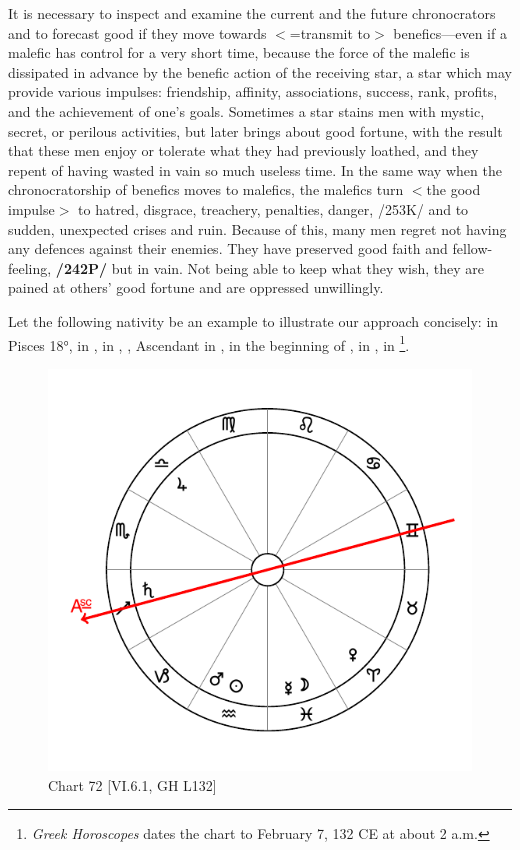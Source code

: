 It is necessary to inspect and examine the current and the future chronocrators and to forecast good if they move towards $<$=transmit to$>$ benefics—even if a malefic has control for a very short time, because the force of the malefic is dissipated in advance by the benefic action of the receiving star, a star which may provide various impulses: friendship, affinity, associations, success, rank, profits, and the achievement of one’s goals. Sometimes a star stains men with mystic, secret, or perilous activities, but later brings about good fortune, with the result that these men enjoy or tolerate what they had previously loathed, and they repent of having wasted in vain so much useless time. In the same way when the chronocratorship of benefics moves to malefics, the malefics turn $<$the good impulse$>$ to hatred, disgrace, treachery, penalties, danger, /253K/ and to sudden, unexpected crises and ruin. Because of this, many men regret not having any defences against their enemies. They have preserved good faith and fellow-feeling, \textbf{/242P/} but in vain. Not being able to keep what they wish, they are pained at others’ good fortune and are oppressed unwillingly.

\newpage
Let the following nativity be an example to illustrate our approach concisely: \Moon\xspace in Pisces 18°, \Venus\xspace in \Aries, \Jupiter\xspace in \Libra, \Saturn, Ascendant in \Sagittarius, \Mars\xspace in the beginning of \Aquarius, \Sun\xspace in \Aquarius, \Mercury\xspace in \Pisces\footnote{\textit{Greek Horoscopes} dates the chart to February 7, 132 CE at about 2 a.m.}. 

\begin{figure}
\centering
\vspace{-20pt}
\includegraphics[width=.68\textwidth]{charts/6_6_1}
\caption{Chart 72 [VI.6.1, GH L132]}
\label{fig:chart72}
\end{figure}

